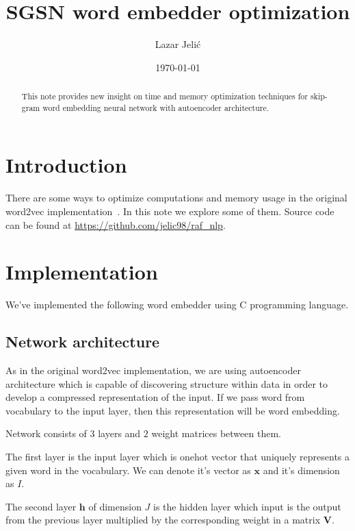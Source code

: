 \documentclass{article}
\title{SGSN word embedder optimization}
\author{Lazar Jelić}
\date{\today}
\begin{document}
\maketitle

\begin{abstract}

This note provides new insight on time and memory optimization techniques for
skip-gram word embedding neural network with autoencoder architecture.

\end{abstract}

\section{Introduction}

There are some ways to optimize computations and memory usage in the
original word2vec implementation~\cite{1301.3781}. In this note we explore some of them. Source
code can be found at \url{https://github.com/jelic98/raf_nlp}.

\section{Implementation}

We've implemented the following word embedder using C programming language.

\subsection{Network architecture}

As in the original word2vec implementation, we are using autoencoder
architecture which is capable of discovering structure within data in order
to develop a compressed representation of the input. If we pass word from
vocabulary to the input layer, then this representation will be word embedding.

\medbreak

Network consists of $3$ layers and $2$ weight matrices between them.

The first layer is the input layer which is onehot vector that uniquely represents a given word in the vocabulary.
We can denote it's vector as $\boldsymbol{x}$ and it's dimension as $I$.

\medbreak

The second layer $\boldsymbol{h}$ of dimension $J$ is the hidden layer which
input is the output from the previous
layer multiplied by the corresponding weight in a matrix $\boldsymbol{V}$.
\end{document}
